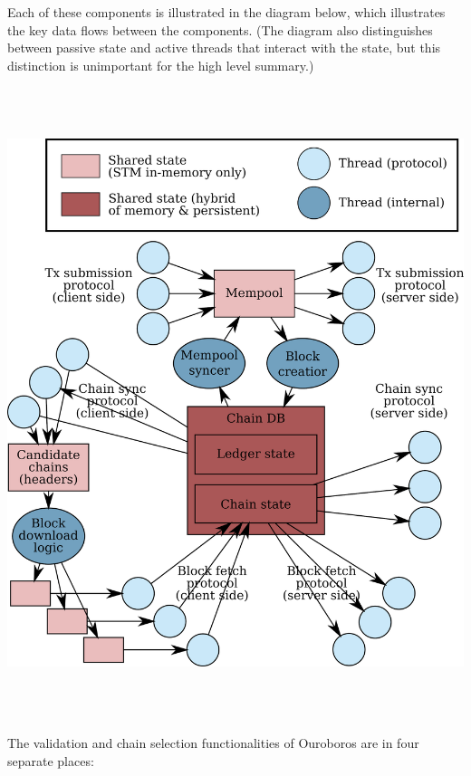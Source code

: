 \documentclass[11pt,a4paper]{article}
\begin{document}
Each of these components is illustrated in the diagram below, which
illustrates the key data flows between the components. (The diagram also
distinguishes between passive state and active threads that interact
with the state, but this distinction is unimportant for the high level
summary.)

\includegraphics[width=6.27083in,height=7.25347in]{./media/image8.png}

The validation and chain selection functionalities of Ouroboros are in
four separate places:
\end{document}

